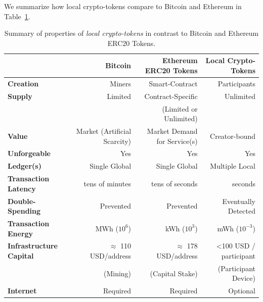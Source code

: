 \documentclass[sigplan,screen,10pt]{acmart}
\begin{document}
We summarize how local crypto-tokens compare to Bitcoin and Ethereum in Table~\ref{tb:properties}.

\begin{table}[t]
\caption{Summary of properties of \textit{local crypto-tokens} in contrast to Bitcoin and Ethereum ERC20 Tokens.}
\label{tb:properties}
\begin{tabular}{l|r|r|r|}
              & \textbf{Bitcoin} & \textbf{Ethereum ERC20 Tokens} & \textbf{Local Crypto-Tokens} \\
\hline
\textbf{Creation}        & Miners                              & Smart-Contract         & Participants \\
\textbf{Supply}           & Limited                             & Contract-Specific      & Unlimited \\
                                   &                                         & (Limited or Unlimited) & \\
\textbf{Value}             & Market (Artificial Scarcity) & Market Demand for Service(s) & Creator-bound \\
\textbf{Unforgeable}   & Yes                                   & Yes                                                             & Yes \\
\textbf{Ledger(s)}            & Single Global               & Single Global                        & Multiple Local \\
\textbf{Transaction Latency} & tens of minutes      & tens of seconds                                                      & seconds \\
\textbf{Double-Spending} & Prevented                 & Prevented                                                 & Eventually Detected \\
\textbf{Transaction Energy} & MWh  ($10^{6}$)                             & kWh   ($10^3$)                                               & mWh ($10^{-3}$) \\
\textbf{Infrastructure Capital} & $\approx$ 110 USD/address
                                    & $\approx$ 178 USD/address   
                                    & <100 USD / participant \\
                                    & (Mining)      &  (Capital Stake)  & (Participant Device)  \\
\textbf{Internet} & Required                            & Required                                  & Optional \\
\end{tabular}
\end{table}
\end{document}
